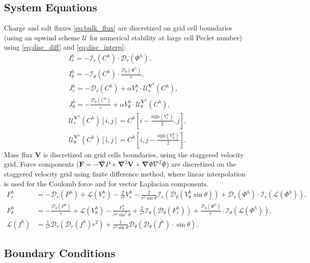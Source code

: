 \documentclass[MSc,beforeExam]{iitcsthesis}
\newcommand{\sign}{\ensuremath{\mathrm{sign}}}
\newcommand{\pars}[1]{\left(#1\right)}
\newcommand\Laplacian{\nabla^2}
\newcommand\bnabla{\boldsymbol{\nabla}}
\newcommand\bLaplacian{\boldsymbol{\nabla}^2}
\newcommand\bV{\boldsymbol{V}}
\newcommand\bF{\boldsymbol{F}}
\newcommand\cI{\mathcal{I}}
\newcommand\cD{\mathcal{D}}
\newcommand\cL{\mathcal{L}}
\begin{document}
\subsection{System Equations} \label{sec:disc_equations}
Charge and salt fluxes \eqref{eq:bulk_flux} are discretized on grid cell boundaries 
(using an upwind scheme $\mathcal{U}$ for numerical stability at large cell Peclet number)  
using \eqref{eq:disc_diff} and \eqref{eq:disc_interp}:
\begin{align} 
\nonumber
I^h_r = -\cI_r(C^h) \cdot \cD_r(\varPhi^h), \\
\nonumber
I^h_\theta = -\cI_\theta(C^h) \cdot \frac{\cD_\theta(\varPhi^h)}{r}, \\
\nonumber
J^h_r = -\cD_r(C^h) + \alpha V^h_r \cdot \mathcal{U}^{\bV^h}_r (C^h), \\
J^h_\theta = -\frac{\cD_\theta(C^h)}{r} + \alpha V^h_\theta \cdot \mathcal{U}^{\bV^h}_\theta (C^h), 
\\ \nonumber
 \mathcal{U}^{\bV^h}_r(C^h)[i,j] = C^h\left[i-\frac{\sign(V^h_r)}{2}, j\right], 
\\ \nonumber
 \mathcal{U}^{\bV^h}_\theta(C^h)[i,j] = C^h\left[i, j-\frac{\sign(V^h_\theta)}{2}\right]. 
\end{align}
Mass flux $\bV$ is discretized on grid cells boundaries, 
using the staggered velocity grid.
Force components ($\bF = -\bnabla P + \bLaplacian \bV + \bnabla \varPhi \Laplacian \varPhi$) 
are discretized on the staggered velocity grid using finite difference
method, where linear interpolation is used for the Coulomb force and 
for vector Laplacian components.
\begin{align}
\nonumber
F^h_r &= -\cD_r(P^h) 
          + \cL(V^h_r) - \frac{2}{r^2} V^h_r 
		  - \frac{2}{r^2 \sin\theta} \cI_r(\cD_\theta (V^h_\theta \sin\theta))
          + \cD_r(\varPhi^h) \cdot \cI_r(\cL(\varPhi^h)), \\
\nonumber
F^h_\theta &= -\frac{\cD_\theta(P^h)}{r} 
		  + \cL(V^h_\theta) - \frac{F^h_\theta}{r^2 \sin^2\theta} 
		  + \frac{2}{r^2} \cI_\theta(\cD_\theta(F^h_r))
		  + \frac{\cD_\theta(\varPhi^h)}{r} \cdot \cI_\theta(\cL(\varPhi^h)), \\
\cL(f^h) &= \frac{1}{r^2}\cD_r\pars{\cD_r(f^h) r^2} + 
\frac{1}{r^2 \sin\theta} \cD_\theta\pars{\cD_\theta(f^h) \cdot \sin\theta}.
\end{align}


\subsection{Boundary Conditions} \label{sec:disc_boundary}
\end{document}
